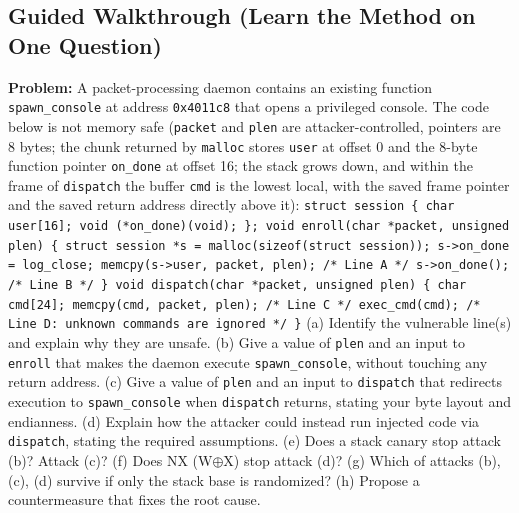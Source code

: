 \documentclass[12pt, a4paper]{article}
\begin{document}
\subsection*{Guided Walkthrough (Learn the Method on One Question)}
\textbf{Problem:} A packet-processing daemon contains an existing function \texttt{spawn\_console} at address \texttt{0x4011c8} that opens a privileged console. The code below is not memory safe (\texttt{packet} and \texttt{plen} are attacker-controlled, pointers are 8 bytes; the chunk returned by \texttt{malloc} stores \texttt{user} at offset 0 and the 8-byte function pointer \texttt{on\_done} at offset 16; the stack grows down, and within the frame of \texttt{dispatch} the buffer \texttt{cmd} is the lowest local, with the saved frame pointer and the saved return address directly above it): \texttt{struct session \{ char user[16]; void (*on\_done)(void); \}; void enroll(char *packet, unsigned plen) \{ struct session *s = malloc(sizeof(struct session)); s->on\_done = log\_close; memcpy(s->user, packet, plen); /* Line A */ s->on\_done(); /* Line B */ \} void dispatch(char *packet, unsigned plen) \{ char cmd[24]; memcpy(cmd, packet, plen); /* Line C */ exec\_cmd(cmd); /* Line D: unknown commands are ignored */ \}} (a) Identify the vulnerable line(s) and explain why they are unsafe. (b) Give a value of \texttt{plen} and an input to \texttt{enroll} that makes the daemon execute \texttt{spawn\_console}, without touching any return address. (c) Give a value of \texttt{plen} and an input to \texttt{dispatch} that redirects execution to \texttt{spawn\_console} when \texttt{dispatch} returns, stating your byte layout and endianness. (d) Explain how the attacker could instead run injected code via \texttt{dispatch}, stating the required assumptions. (e) Does a stack canary stop attack (b)? Attack (c)? (f) Does NX (W$\oplus$X) stop attack (d)? (g) Which of attacks (b), (c), (d) survive if only the stack base is randomized? (h) Propose a countermeasure that fixes the root cause.
\end{document}
